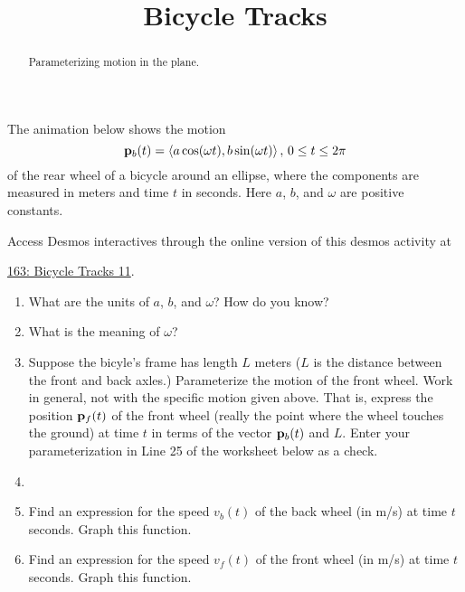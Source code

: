 \documentclass{ximera}
\title{Bicycle Tracks}
\begin{document}
\begin{abstract}
Parameterizing motion in the plane. 
\end{abstract}
\maketitle

\begin{exploration}  \label{E948959409303}

The animation below shows the motion
\[
   {\bf p}_b(t) = \langle a\cos (\omega t), b \sin (\omega t)  \rangle \, , \, 0\leq t \leq 2\pi 
\]
of the rear wheel of a bicycle around an ellipse, where the components are measured in meters and time $t$ in seconds.
Here $a$, $b$, and $\omega$ are positive constants.

\begin{onlineOnly}
    \begin{center}
\end{center}
\end{onlineOnly}

Access Desmos interactives through the online version of this desmos activity at
 
\href{https://www.desmos.com/calculator/nb3hc46lsw}{163: Bicycle Tracks 11}.  %


\begin{enumerate}
\item What are the units of $a$, $b$, and $\omega$? How do you know?

\item  What is the meaning of $\omega$?

\item Suppose the bicyle's frame has length $L$ meters ($L$ is the distance between the front and back axles.) Parameterize the motion of the front wheel. Work in general, not with the specific motion given above. That is, express the position ${\bf p}_f(t)$
of the front wheel (really the point where the wheel touches the ground) at time $t$ in terms of the vector ${\bf p}_b(t)$ and $L$.
Enter your parameterization in Line 25 of the worksheet below as a check.

\item

\item Find an expression for the speed $v_b(t)$ of the back wheel (in m/s) at time $t$ seconds. Graph this function.

\item Find an expression for the speed $v_f(t)$ of the front wheel (in m/s) at time $t$ seconds. Graph this function.


\end{enumerate}
\end{exploration}
\end{document}
